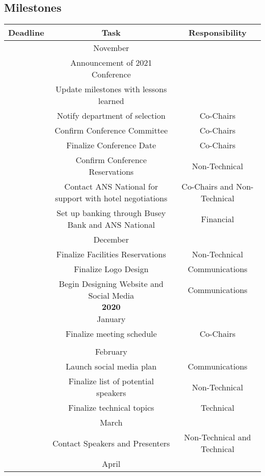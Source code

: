 \subsection{Milestones}

\begin{center}
\begin{longtable}{c |  c  c}
\hline\hline
Deadline & Task & Responsibility\\
\hline\hline

&November&\\
\hline\hline
& Announcement of 2021 Conference & \\
& Update milestones with lessons learned &\\
& Notify department of selection & Co-Chairs\\
& Confirm Conference Committee & Co-Chairs\\
& Finalize Conference Date & Co-Chairs\\
& Confirm Conference Reservations & Non-Technical\\
& Contact ANS National for support with hotel negotiations& Co-Chairs and Non-Technical\\
& Set up banking through Busey Bank and ANS National& Financial\\
\hline\hline
&December&\\
\hline\hline
&Finalize Facilities Reservations& Non-Technical\\
&Finalize Logo Design& Communications\\
&Begin Designing Website and Social Media& Communications\\
\hline\hline
&$\textbf{2020}$&\\
\hline\hline
&January&\\
\hline\hline
& Finalize meeting schedule& Co-Chairs\\
&&\\
\hline\hline
&February&\\
\hline\hline
& Launch social media plan& Communications\\
& Finalize list of potential speakers& Non-Technical\\
& Finalize technical topics& Technical\\
\hline\hline
&March&\\
\hline\hline
& Contact Speakers and Presenters& Non-Technical and Technical\\
\hline\hline
&April&\\

\end{longtable}
\end{center}
